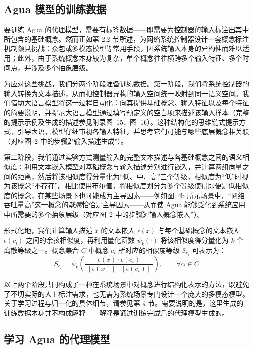 \documentclass[11pt,a4paper]{article}
\begin{document}
\subsection{Agua 模型的训练数据}

要训练 Agua 的代理模型，需要有标签数据——即需要为控制器的输入标注出其中所包含的基础概念。然而正如第 2.2 节所述，为网络系统控制器设计一套概念标注机制颇具挑战：众包或多模态模型等常用手段，因系统输入本身的异构性而难以适用；此外，由于系统概念本身较为复杂，单个概念往往横跨多个输入特征、多个时间点，并涉及多个抽象层级。

为应对这些挑战，我们分两个阶段准备训练数据。第一阶段，我们将系统控制器的输入转换为文本描述，从而把控制器异构的输入空间统一映射到同一语义空间。我们借助大语言模型将这一过程自动化：向其提供基础概念、输入特征以及每个特征的简要说明，并提示大语言模型通过填写预定义的空白项来描述该输入样本（完整的提示示例及生成的描述参见附录图~15、图~16）。这种结构化的思维链式提示方式，引导大语言模型仔细审视各输入特征，并思考它们可能与哪些底层概念相关联（对应图~2 中的步骤\textcircled{2}"输入描述生成"）。

第二阶段，我们通过实验方式测量输入的完整文本描述与各基础概念之间的语义相似度：利用文本嵌入模型对基础概念与输入描述分别进行嵌入，并计算两组向量之间的距离，然后将该相似度得分量化为“低、中、高”三个等级，相似度为“低”时视为该概念“不存在”。相比使用布尔值，将相似度划分为多个等级使得即便是低相似度的概念，在某些场景下也可能成为主导因素——例如图~4b 所示场景中，“网络吞吐量高”这一概念的\emph{缺席}恰恰是主导因素——从而使 Agua 能够泛化到系统应用中所需要的多个抽象层级（对应图~2 中的步骤\textcircled{3}“输入概念嵌入”）。

形式化地，我们计算输入描述 $x$ 的文本嵌入 $\epsilon(x)$ 与每个基础概念的文本嵌入 $\epsilon(c_i)$ 之间的余弦相似度，再利用量化函数 $\psi_k(\cdot)$ 将该相似度得分量化为 $k$ 个离散等级之一。概念集合 $C$ 中概念 $c_i$ 所对应的相似度等级 $S_{c_i}$ 可表示为：
\begin{equation}
S_{c_i} = \psi_k\!\left(\frac{\epsilon(x)\cdot\epsilon(c_i)}{\lVert\epsilon(x)\rVert\,\lVert\epsilon(c_i)\rVert}\right), \qquad \forall c_i\in C
\label{eq:sim-class}
\end{equation}

以上两个阶段共同构成了一种在系统场景中对概念进行结构化表示的方法，既避免了不切实际的人工标注需求，也无需为系统场景专门设计一个庞大的多模态模型。关于学习过程与归一化的具体细节，请参见第 4 节。需要说明的是，这里生成的训练数据本身并不构成解释——解释是通过训练完成后的代理模型生成的。

\subsection{学习 Agua 的代理模型}
\end{document}
